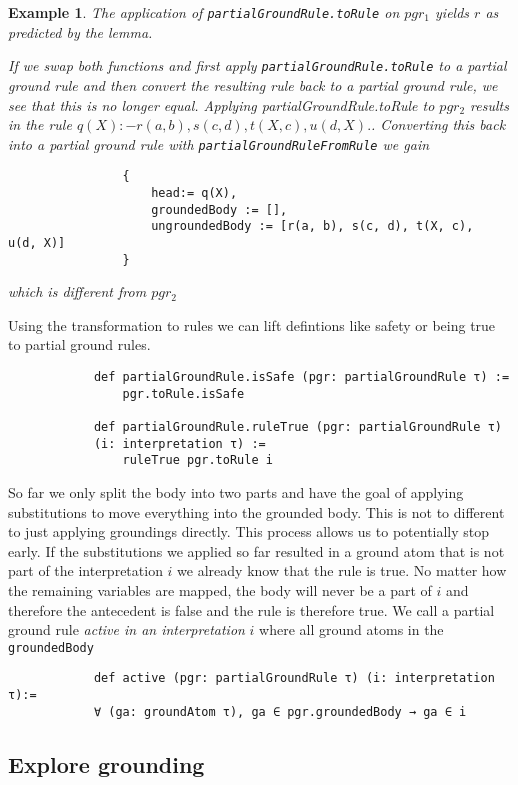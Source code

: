\documentclass{article}
\newtheorem{example}{Example}
\begin{document}
        \begin{example}
            The application of \texttt{partialGroundRule.toRule} on $pgr_1$ yields $r$ as predicted by the lemma.

            If we swap both functions and first apply \texttt{partialGroundRule.toRule} to a partial ground rule and then convert the resulting rule back to a partial ground rule, we see that this is no longer equal. Applying {partialGroundRule.toRule} to $pgr_2$ results in the rule $ q(X) :- r(a, b), s(c, d), t(X, c),  u(d, X) . $. Converting this back into a partial ground rule with \texttt{partialGroundRuleFromRule} we gain 

            \begin{lstlisting}
                {
                    head:= q(X),
                    groundedBody := [],
                    ungroundedBody := [r(a, b), s(c, d), t(X, c),  u(d, X)]
                }
            \end{lstlisting}
            which is different from $pgr_2$
        \end{example}

        Using the transformation to rules we can lift defintions like safety or being true to partial ground rules.

        \begin{lstlisting}
            def partialGroundRule.isSafe (pgr: partialGroundRule τ) :=
                pgr.toRule.isSafe

            def partialGroundRule.ruleTrue (pgr: partialGroundRule τ) 
            (i: interpretation τ) :=
                ruleTrue pgr.toRule i
        \end{lstlisting}

        So far we only split the body into two parts and have the goal of applying substitutions to move everything into the grounded body. This is not to different to just applying groundings directly. 
        This process allows us to potentially stop early. If the substitutions we applied so far resulted in a ground atom that is not part of the interpretation $i$ we already know that the rule is true. No matter how the remaining variables are mapped, the body will never be a part of $i$ and therefore the antecedent is false and the rule is therefore true. We call a partial ground rule \textit{active in an interpretation} $i$ where all ground atoms in the \texttt{groundedBody} 

        \begin{lstlisting}
            def active (pgr: partialGroundRule τ) (i: interpretation τ):=
            ∀ (ga: groundAtom τ), ga ∈ pgr.groundedBody → ga ∈ i 
        \end{lstlisting}

    \subsection{Explore grounding}

    
    
\end{document}
